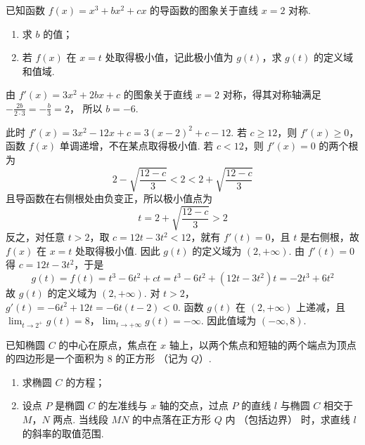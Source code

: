 \begin{problem}
已知函数 \( f(x) = x^3 + bx^2 + cx \) 的导函数的图象关于直线 \( x = 2 \) 对称.
\begin{enumerate}
\item 求 \( b \) 的值；
\item 若 \( f(x) \) 在 \( x = t \) 处取得极小值，记此极小值为 \( g(t) \)，求 \( g(t) \) 的定义域和值域.
\end{enumerate}
\end{problem}

\begin{solution}
由 \(f'(x)=3x^2+2bx+c\) 的图象关于直线 \(x=2\) 对称，得其对称轴满足 \(-\frac{2b}{2\cdot3}=-\frac{b}{3}=2\)，
所以 \(b=-6\).

此时 \(f'(x)=3x^2-12x+c=3(x-2)^2+c-12\). 若 \(c\geqslant12\)，则 \(f'(x)\geqslant0\)，函数 \(f(x)\) 单调递增，不在某点取得极小值. 若 \(c<12\)，则 \(f'(x)=0\) 的两个根为
\[
2-\sqrt{\frac{12-c}{3}}<2<2+\sqrt{\frac{12-c}{3}}
\]
且导函数在右侧根处由负变正，所以极小值点为
\[
t=2+\sqrt{\frac{12-c}{3}}>2
\]
反之，对任意 \(t>2\)，取 \(c=12t-3t^2<12\)，就有 \(f'(t)=0\)，且 \(t\) 是右侧根，故 \(f(x)\) 在 \(x=t\) 处取得极小值. 因此 \(g(t)\) 的定义域为 \((2,+\infty)\). 由 \(f'(t)=0\) 得 \(c=12t-3t^2\)，于是
\[
g(t)=f(t)=t^3-6t^2+ct
=t^3-6t^2+(12t-3t^2)t
=-2t^3+6t^2
\]
故 \(g(t)\) 的定义域为 \((2,+\infty)\). 对 \(t>2\)，\(g'(t)=-6t^2+12t=-6t(t-2)<0\). 函数 \(g(t)\) 在 \((2,+\infty)\) 上递减，且 \(\lim_{t\to2^+}g(t)=8\)，\(\lim_{t\to+\infty}g(t)=-\infty\).
因此值域为 \((-\infty,8)\).
\end{solution}

\begin{problem}
已知椭圆 \(C\) 的中心在原点，焦点在 \(x\) 轴上，以两个焦点和短轴的两个端点为顶点的四边形是一个面积为 8 的正方形 （记为 \(Q\)）.
\begin{enumerate}
\item 求椭圆 \(C\) 的方程；
\item 设点 \(P\) 是椭圆 \(C\) 的左准线与 \(x\) 轴的交点，过点 \(P\) 的直线 \(l\) 与椭圆 \(C\) 相交于 \(M\)，\(N\) 两点. 当线段 \(MN\) 的中点落在正方形 \(Q\) 内 （包括边界） 时，求直线 \(l\) 的斜率的取值范围.
\end{enumerate}
\end{problem}

